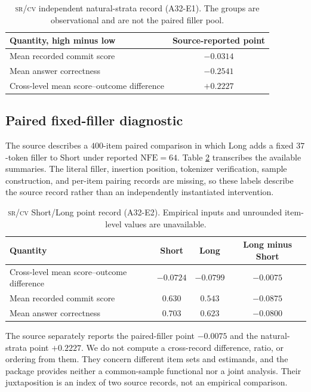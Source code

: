 \documentclass{article}
\newcommand{\srcv}{\textsc{sr/cv}}
\begin{document}
\begin{table}[H]
\centering
\caption{\srcv{} independent natural-strata record (A32-E1).  The groups are
observational and are not the paired filler pool.}
\label{tab:natural}
\small
\begin{tabular}{@{}lc@{}}
\toprule
Quantity, high minus low & Source-reported point \\
\midrule
Mean recorded commit score & $-0.0314$ \\
Mean answer correctness & $-0.2541$ \\
Cross-level mean score--outcome difference & $+0.2227$ \\
\bottomrule
\end{tabular}
\normalsize
\end{table}

\subsection{Paired fixed-filler diagnostic}

The source describes a $400$-item paired comparison in which Long adds a fixed
$37$-token filler to Short under reported $\mathrm{NFE}{=}64$.  Table
\ref{tab:filler} transcribes the available summaries.  The literal filler, insertion
position, tokenizer verification, sample construction, and per-item pairing records are
missing, so these labels describe the source record rather than an independently
instantiated intervention.

\begin{table}[H]
\centering
\caption{\srcv{} Short/Long point record (A32-E2).  Empirical inputs and
unrounded item-level values are unavailable.}
\label{tab:filler}
\small
\setlength{\tabcolsep}{5pt}
\begin{tabular}{@{}lccc@{}}
\toprule
Quantity & Short & Long & Long minus Short \\
\midrule
Cross-level mean score--outcome difference
  & $-0.0724$ & $-0.0799$ & $-0.0075$ \\
Mean recorded commit score
  & $0.630$ & $0.543$ & $-0.0875$ \\
Mean answer correctness
  & $0.703$ & $0.623$ & $-0.0800$ \\
\bottomrule
\end{tabular}
\normalsize
\end{table}

The source separately reports the paired-filler point $-0.0075$ and the natural-strata
point $+0.2227$.  We do not compute a cross-record difference, ratio, or ordering from
them.  They concern different item sets and estimands, and the package
provides neither a common-sample functional nor a joint analysis.  Their juxtaposition
is an index of two source records, not an empirical comparison.
\end{document}

